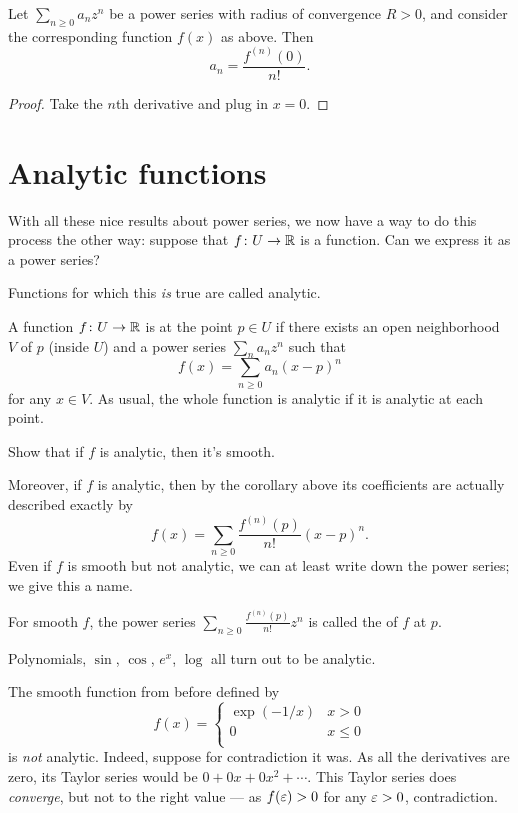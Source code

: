\begin{corollary}
	Let $\sum_{n \ge 0} a_n z^n$ be a power series with radius of convergence $R > 0$,
	and consider the corresponding function $f(x)$ as above.
	Then
	\[ a_n = \frac{f^{(n)}(0)}{n!}. \]
\end{corollary}
\begin{proof}
	Take the $n$th derivative and plug in $x=0$.
\end{proof}

\section{Analytic functions}
With all these nice results about power series,
we now have a way to do this process the other way:
suppose that $f \colon U \to \mathbb R$ is a function.
Can we express it as a power series?

Functions for which this \emph{is} true are called analytic.
\begin{definition}
	A function $f \colon U \to \mathbb R$ is  at
	the point $p \in U$
	if there exists an open neighborhood $V$ of $p$ (inside $U$)
	and a power series $\sum_n a_n z^n$ such that
	\[ f(x) = \sum_{n \ge 0} a_n (x-p)^n \]
	for any $x \in V$.
	As usual, the whole function is analytic if it is analytic at each point.
\end{definition}
\begin{ques}
	Show that if $f$ is analytic, then it's smooth.
\end{ques}
Moreover, if $f$ is analytic,
then by the corollary above its coefficients are
actually described exactly by
\[ f(x) = \sum_{n \ge 0} \frac{f^{(n)}(p)}{n!} (x-p)^n. \]
Even if $f$ is smooth but not analytic,
we can at least write down the power series;
we give this a name.
\begin{definition}
	For smooth $f$,
	the power series $\sum_{n \ge 0} \frac{f^{(n)}(p)}{n!} z^n$
	is called the  of $f$ at $p$.
\end{definition}

\begin{example}
	\listhack
	\label{ex:nonanalytic}
	\begin{enumerate}[(a)]
		\ii Polynomials, $\sin$, $\cos$, $e^x$, $\log$
		all turn out to be analytic.

		\ii The smooth function from before defined by
		\[ f(x) = \begin{cases}
				\exp(-1/x) & x > 0 \\
				0 & x \le 0 \\
			\end{cases}
		\]
		is \emph{not} analytic.
		Indeed, suppose for contradiction it was.
		As all the derivatives are zero,
		its Taylor series would be $0 + 0x + 0x^2 + \cdots$.
		This Taylor series does \emph{converge}, but not to the right value ---
		as $f(\varepsilon) > 0$ for any $\varepsilon > 0$, contradiction.
	\end{enumerate}
\end{example}

